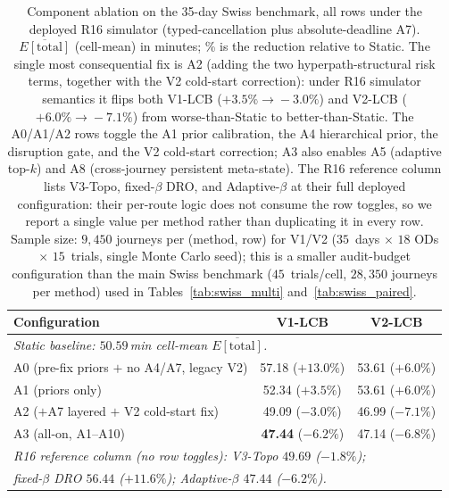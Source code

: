 \documentclass[11pt]{article}
\theoremstyle{definition}
\theoremstyle{remark}
\begin{document}
\begin{table}[t]
\centering
\caption{Component ablation on the 35-day Swiss benchmark, all
rows under the deployed R16 simulator (typed-cancellation plus
absolute-deadline A7). $\overline{E[\mathrm{total}]}$ (cell-mean)
in minutes; \% is the reduction relative to Static. The single
most consequential fix is A2 (adding the two hyperpath-structural
risk terms, together with the V2 cold-start correction): under
R16 simulator semantics it flips both V1-LCB
($+3.5\%\!\to\!-3.0\%$) and V2-LCB ($+6.0\%\!\to\!-7.1\%$) from
worse-than-Static to better-than-Static. The A0/A1/A2 rows toggle
the A1 prior calibration, the A4 hierarchical prior, the
disruption gate, and the V2 cold-start correction; A3 also
enables A5 (adaptive top-$k$) and A8 (cross-journey persistent
meta-state). The R16 reference column lists V3-Topo,
fixed-$\beta$ DRO, and Adaptive-$\beta$ at their full deployed
configuration: their per-route logic does not consume the row
toggles, so we report a single value per method rather than
duplicating it in every row. Sample size: $9{,}450$ journeys per
(method, row) for V1/V2 ($35$~days $\times$ $18$ ODs $\times$
$15$~trials, single Monte Carlo seed); this is a smaller
audit-budget configuration than the main Swiss benchmark
($45$~trials/cell, $28{,}350$ journeys per method) used in
Tables~\ref{tab:swiss_multi} and~\ref{tab:swiss_paired}.}
\label{tab:swiss_ablation}
\scriptsize
\setlength{\tabcolsep}{3pt}
\begin{tabular}{l cc}
\toprule
Configuration             & V1-LCB & V2-LCB \\
\midrule
\multicolumn{3}{l}{\emph{Static baseline: $50.59$\,min cell-mean $\overline{E[\mathrm{total}]}$.}} \\
A0 (pre-fix priors $+$ no A4/A7, legacy V2)
                          & 57.18 ($+13.0\%$) & 53.61 ($+6.0\%$) \\
A1 (priors only)          & 52.34 ($+3.5\%$)  & 53.61 ($+6.0\%$) \\
A2 ($+$A7 layered $+$ V2 cold-start fix)
                          & 49.09 ($-3.0\%$)  & 46.99 ($-7.1\%$) \\
A3 (all-on, A1--A10)      & \textbf{47.44} ($\bm{-6.2\%}$) & 47.14 ($-6.8\%$) \\
\midrule
\multicolumn{3}{l}{\emph{R16 reference column (no row toggles): V3-Topo $49.69$ ($-1.8\%$);}} \\
\multicolumn{3}{l}{\emph{fixed-$\beta$ DRO $56.44$ ($+11.6\%$); Adaptive-$\beta$ $47.44$ ($-6.2\%$).}} \\
\bottomrule
\end{tabular}
\end{table}
\end{document}
